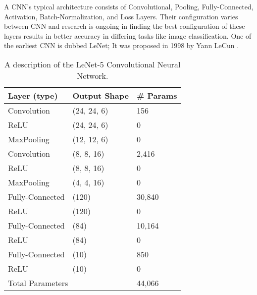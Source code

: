 A CNN's typical architecture consists of Convolutional, Pooling, Fully-Connected, Activation, Batch-Normalization, and Loss Layers. Their configuration varies between CNN and research is ongoing in finding the best configuration of these layers results in better accuracy in differing tasks like image classification. One of the earliest CNN is dubbed LeNet; It was proposed in 1998 by Yann LeCun \cite{lecun1998gradient}. 

\begin{table}
	\begin{tabularx}{\columnwidth}{|X|X|X|} \hline
		Layer (type) & Output Shape & \# Params \\ \hline\hline
		Convolution  & (24, 24, 6) & 156 \\
		ReLU & (24, 24, 6) & 0 \\
		MaxPooling & (12, 12, 6) & 0 \\
		Convolution & (8, 8, 16) & 2,416 \\
		ReLU & (8, 8, 16) & 0 \\
		MaxPooling & (4, 4, 16) & 0 \\
		Fully-Connected & (120) & 30,840 \\
		ReLU & (120) & 0 \\
		Fully-Connected & (84) & 10,164 \\
		ReLU & (84) & 0 \\
		Fully-Connected & (10) & 850 \\
		ReLU & (10) & 0 \\ \hline
		\multicolumn{2}{|l|}{Total Parameters} & 44,066 \\\hline
	\end{tabularx}
\caption{A description of the LeNet-5 Convolutional Neural Network.}
\end{table}

